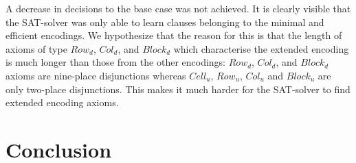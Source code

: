 \documentclass{article}
\begin{document}
A decrease in decisions to the base case was not achieved. It is clearly visible that the SAT-solver was only able to learn clauses belonging to the minimal and efficient encodings. We hypothesize that the reason for this is that the length of axioms of type $Row_d$, $Col_d$, and $Block_d$ which characterise the extended encoding is much longer than those from the other encodings: $Row_d$, $Col_d$, and $Block_d$ axioms are nine-place disjunctions whereas $Cell_u$, $Row_u$, $Col_u$ and $Block_u$ are only two-place disjunctions. This makes it much harder for the SAT-solver to find extended encoding axioms.




\section{Conclusion} \label{conclusion}




\end{document}
